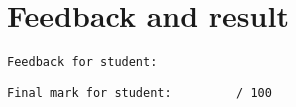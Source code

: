 \documentclass[11pt,a4paper]{report}
\begin{document}
\vskip10pt
\section*{Feedback and result}
\begin{verbatim}Feedback for student:\end{verbatim}

\vskip65pt

\begin{verbatim}Final mark for student:         / 100\end{verbatim}
\end{document}

